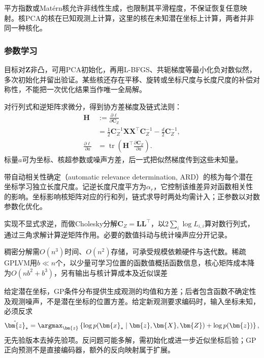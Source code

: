 平方指数或Matérn核允许非线性生成，也限制其平滑程度，不保证恢复任意映射。核PCA的核在已知观测上计算，这里的核在未知潜在坐标上计算，两者并非同一种核化。

\subsubsection{参数学习}
\label{sec:dim-gplvm-learning}

目标对$\bm{Z}$非凸，可用PCA初始化，再用L-BFGS、共轭梯度等最小化负对数似然，多次初始化并留出验证。某些核还存在平移、旋转或坐标尺度与长度尺度的补偿对称性，不能把一次优化结果当作唯一全局解。

对行列式和逆矩阵求微分，得到协方差梯度及链式法则：
\begin{equation}
\label{eq:dim-gplvm-gradient}
\begin{aligned}
\bm{H}&:=\frac{\partial\ell}{\partial\bm{C}_Z}\\
&=\frac12\bm{C}_Z^{-1}\bm{X}\bm{X}^\top\bm{C}_Z^{-1}
-\frac d2\bm{C}_Z^{-1},\\
\frac{\partial\ell}{\partial a}
&=\operatorname{tr}\left(
\bm{H}^\top\frac{\partial\bm{C}_Z}{\partial a}\right).
\end{aligned}
\end{equation}
标量$a$可为坐标、核超参数或噪声方差，后一式把似然梯度传到这些未知量。

带自动相关性确定（automatic relevance determination, ARD）的核为每个潜在坐标学习独立长度尺度。记逆长度尺度平方为$\alpha_r$，它控制该维差异对函数相关性的影响。坐标影响核矩阵对应的行和列，链式求导时两处均需计入；正参数以对数参数化优化。

实现不显式求逆，而做Cholesky分解$\bm{C}_Z=\bm{L}\bm{L}^\top$，以$2\sum_i\log L_{i,i}$算对数行列式，通过三角求解计算逆矩阵作用。必要的数值抖动与统计噪声应分开记录。

稠密分解需$O(n^3)$时间、$O(n^2)$存储，可承受规模依赖硬件与迭代数。稀疏GPLVM用$b\ll n$个，以少量可学习位置的函数值概括函数信息，核心矩阵成本降为$O(nb^2+b^3)$，另有输出与核计算成本及近似误差

给定潜在坐标，GP条件分布提供生成观测的均值和方差；后者包含函数不确定性及观测噪声，不是潜在坐标的位置方差。给定新观测要求编码时，输入坐标未知，必须反求
\begin{equation}
\label{eq:dim-gplvm-encoding}
\hat{\bm{z}}_*=\argmax_{\bm{z}}
\left\{\log p(\bm{x}_*\mid\bm{z},\bm{X},\bm{Z})
+\log p(\bm{z})\right\},
\end{equation}
无先验版本去掉先验项。反问题可能多解，需初始化或进一步近似坐标后验；GP正向预测不是直接编码器，额外的反向映射属于扩展。


